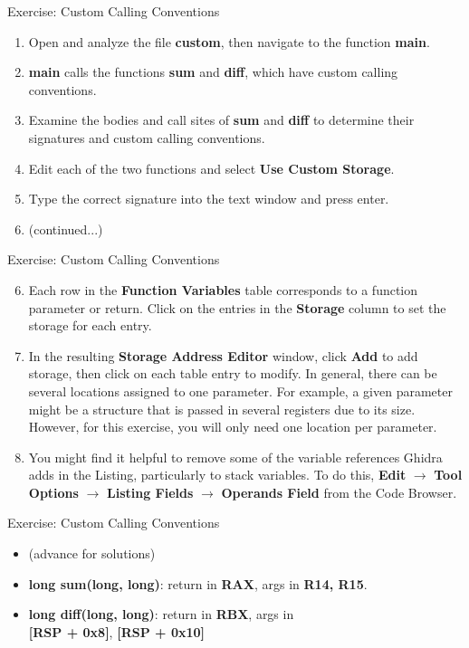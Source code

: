 \documentclass{beamer}
\begin{document}
\begin{frame}
\begin{block}{Exercise: Custom Calling Conventions}
\begin{enumerate}
\item Open and analyze the file \textbf{custom}, then navigate to the function \textbf{main}. 
\item \textbf{main} calls the functions \textbf{sum} and \textbf{diff}, which have custom calling conventions.
\item Examine the bodies and call sites of \textbf{sum} and \textbf{diff} to determine their signatures and custom calling conventions.
\item Edit each of the two functions and select \textbf{Use Custom Storage}.
\item Type the correct signature into the text window and press enter.
\item[] (continued...)
\end{enumerate}
\end{block}
\end{frame}

\begin{frame}
\begin{block}{Exercise: Custom Calling Conventions}
\begin{enumerate}
\setcounter{enumi}{5}
\item Each row in the \textbf{Function Variables} table corresponds to a function parameter or return. Click on the entries in the \textbf{Storage} 
column to set the storage for each entry.
\item In the resulting \textbf{Storage Address Editor} window, click \textbf{Add} to add storage, then click on each
table entry to modify. In general, there can be several locations assigned to one parameter. For example, a given parameter might be a structure that is passed
in several registers due to its size.  However, for this exercise, you will only need one location per parameter.
\item You might find it helpful to remove some of the variable references Ghidra adds in the Listing, particularly to stack variables.  To do this, \textbf{Edit} 
$\rightarrow$ \textbf{Tool Options} $\rightarrow$ \textbf{Listing Fields} $\rightarrow$ \textbf{Operands Field} from the Code Browser.
\end{enumerate}
\end{block}
\end{frame}

\begin{frame}
\begin{block}{Exercise: Custom Calling Conventions}
\begin{itemize}
\item[] (advance for solutions)
\pause
\item \textbf{long sum(long, long)}: return in \textbf{RAX}, args in \textbf{R14, R15}.
\item \textbf{long diff(long, long)}: return in \textbf{RBX}, args in \\ \textbf{[RSP + 0x8]}, \textbf{[RSP + 0x10]}
\end{itemize}
\end{block}
\end{frame}
\end{document}
